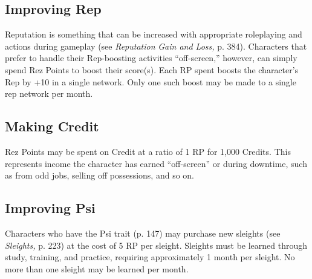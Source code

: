 \subsection{Improving Rep}

Reputation is something that can be increased
with appropriate roleplaying and
actions during gameplay (see \textit{Reputation }
\textit{Gain and Loss,} p. 384). Characters that 
prefer to handle their Rep-boosting activities 
``off-screen,'' however, can simply spend Rez 
Points to boost their score(s). Each RP spent 
boosts the character's Rep by +10 in a single 
network. Only one such boost may be made 
to a single rep network per month.

\subsection{Making Credit}

Rez Points may be spent on Credit at a ratio 
of 1 RP for 1,000 Credits. This represents 
income the character has earned ``off-screen'' 
or during downtime, such as from odd jobs, 
selling off possessions, and so on.

\subsection{Improving Psi}

Characters who have the Psi trait (p. 147) 
may purchase new sleights (see \textit{Sleights,} p. 
223) at the cost of 5 RP per sleight. Sleights 
must be learned through study, training, and 
practice, requiring approximately 1 month 
per sleight. No more than one sleight may be 
learned per month.
